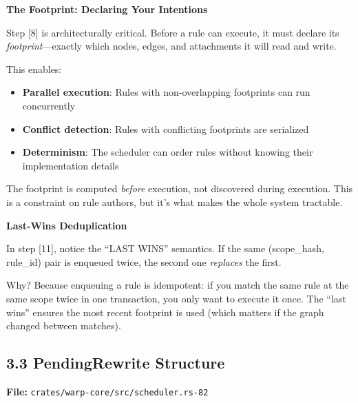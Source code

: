 \documentclass[11pt]{book}
\begin{document}
\begin{deepdive}
\textbf{The Footprint: Declaring Your Intentions}

Step [8] is architecturally critical. Before a rule can execute, it must declare its \emph{footprint}---exactly which nodes, edges, and attachments it will read and write.

This enables:
\begin{itemize}
\item \textbf{Parallel execution}: Rules with non-overlapping footprints can run concurrently
\item \textbf{Conflict detection}: Rules with conflicting footprints are serialized
\item \textbf{Determinism}: The scheduler can order rules without knowing their implementation details
\end{itemize}

The footprint is computed \emph{before} execution, not discovered during execution. This is a constraint on rule authors, but it's what makes the whole system tractable.
\end{deepdive}

\begin{cleverpattern}
\textbf{Last-Wins Deduplication}

In step [11], notice the ``LAST WINS'' semantics. If the same (scope\_hash, rule\_id) pair is enqueued twice, the second one \emph{replaces} the first.

Why? Because enqueuing a rule is idempotent: if you match the same rule at the same scope twice in one transaction, you only want to execute it once. The ``last wins'' ensures the most recent footprint is used (which matters if the graph changed between matches).
\end{cleverpattern}

\subsection{3.3 PendingRewrite
Structure}\label{pendingrewrite-structure}

\textbf{File:} \texttt{crates/warp-core/src/scheduler.rs-82}
\end{document}
